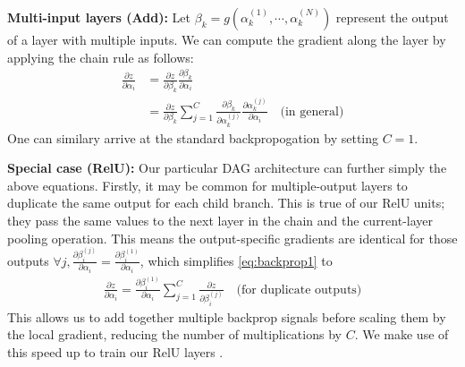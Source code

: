 \documentclass[10pt,twocolumn,letterpaper]{article}
\begin{document}
{\bf Multi-input layers (Add):} Let $\beta_k=g(\alpha^{(1)}_k,\cdots,\alpha^{(N)}_k)$ represent the output of a layer with multiple inputs. We can compute the gradient along the layer by applying the chain rule as follows:
\begin{align}
\frac{\partial z}{\partial \alpha_i}&=\frac{\partial z}{\partial \beta_k}\frac{\partial \beta_k}{\partial \alpha_i} \nonumber \\
&=\frac{\partial z}{\partial \beta_k}\sum_{j=1}^{C}\frac{\partial \beta_k}{\partial \alpha_k^{(j)}}\frac{\partial \alpha_k^{(j)}}{\partial \alpha_i} \quad \text{(in general)} \label{eq:backprop2}
\end{align} 
One can similary arrive at the standard backpropogation by setting $C=1$.



{\bf Special case (RelU):} Our particular DAG architecture can further simply the above equations. Firstly, it may be common for multiple-output layers to duplicate the same output for each child branch. This is true of our RelU units; they pass the same values to the next layer in the chain and the current-layer pooling operation. This means the output-specific gradients are identical for those outputs $\forall j, \frac{\partial \beta_i^{(j)}}{\partial \alpha_i} =  \frac{\partial \beta_i^{(1)}}{\partial \alpha_i}$, which simplifies \eqref{eq:backprop1} to
\begin{align}
\frac{\partial z}{\partial \alpha_i} = \frac{\partial \beta_i^{(1)}}{\partial \alpha_i} \sum_{j=1}^{C}\frac{\partial z}{\partial \beta_i^{(j)}} \quad \text{(for duplicate outputs)}
\end{align}
This allows us to add together multiple backprop signals before scaling them by the local gradient, reducing 
the number of multiplications by $C$. We make use of this speed up to train our RelU layers
. 
\end{document}

